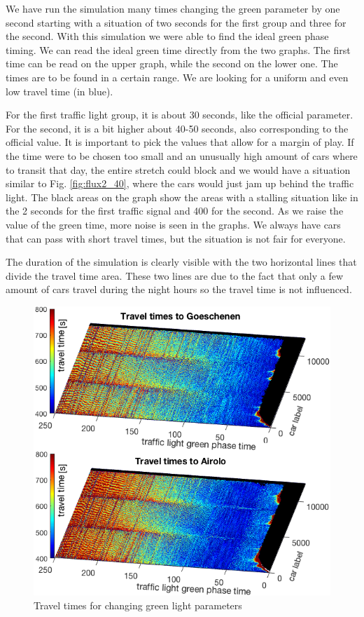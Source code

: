 \documentclass[11pt,a4paper,parskip=half-]{article}
\begin{document}
We have run the simulation many times changing the green parameter by one second starting with a situation of two seconds for the first group and three for the second. With this simulation we were able to find the ideal green phase timing. We can read the ideal green time directly from the two graphs. The first time can be read on the upper graph, while the second on the lower one. The times are to be found in a certain range. We are looking for a uniform and even low travel time (in blue).  

For the first traffic light group, it is about 30 seconds, like the official parameter. For the second, it is a bit higher about 40-50 seconds, also corresponding to the official value. It is important to pick the values that allow for a margin of play. If the time were to be chosen too small and an unusually high amount of cars where to transit that day, the entire stretch could block and we would have a situation similar to Fig. \ref{fig:flux2_40}, where the cars would just jam up behind the traffic light. The black areas on the graph show the areas with a stalling situation like in the 2 seconds for the first traffic signal and 400 for the second. As we raise the value of the green time, more noise is seen in the graphs. We always have cars that can pass with short travel times, but the situation is not fair for everyone. 

The duration of the simulation is clearly visible with the two horizontal lines that divide the travel time area. These two lines are due to the fact that only a few amount of cars travel during the night hours so the travel time is not influenced.


\begin{figure}[h!]
\includegraphics[scale=0.65]{3}
\centering
\vspace*{-4mm}
\caption{Travel times for changing green light parameters}
\label{fig:3}
\end{figure}
\end{document}
